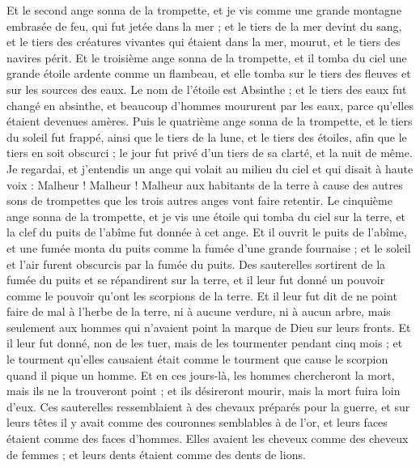 \begin{multicols}{2}
Et le second ange sonna de la trompette, et je vis comme une grande montagne embrasée de feu, qui fut jetée dans la mer ; et le tiers de la mer devint du sang,
et le tiers des créatures vivantes qui étaient dans la mer, mourut, et le tiers des navires périt.
Et le troisième ange sonna de la trompette, et il tomba du ciel une grande étoile ardente comme un flambeau, et elle tomba sur le tiers des fleuves et sur les sources des eaux.
Le nom de l'étoile est Absinthe ; et le tiers des eaux fut changé en absinthe, et beaucoup d'hommes moururent par les eaux, parce qu'elles étaient devenues amères.
Puis le quatrième ange sonna de la trompette, et le tiers du soleil fut frappé, ainsi que le tiers de la lune, et le tiers des étoiles, afin que le tiers en soit obscurci ; le jour fut privé d'un tiers de sa clarté, et la nuit de même.
Je regardai, et j'entendis un ange qui volait au milieu du ciel et qui disait à haute voix : Malheur ! Malheur ! Malheur aux habitants de la terre à cause des autres sons de trompettes que les trois autres anges vont faire retentir.
\VerseOne{}Le cinquième ange sonna de la trompette, et je vis une étoile qui tomba du ciel sur la terre, et la clef du puits de l'abîme fut donnée à cet ange.
Et il ouvrit le puits de l'abîme, et une fumée monta du puits comme la fumée d'une grande fournaise ; et le soleil et l'air furent obscurcis par la fumée du puits.
Des sauterelles sortirent de la fumée du puits et se répandirent sur la terre, et il leur fut donné un pouvoir comme le pouvoir qu'ont les scorpions de la terre.
Et il leur fut dit de ne point faire de mal à l'herbe de la terre, ni à aucune verdure, ni à aucun arbre, mais seulement aux hommes qui n'avaient point la marque de Dieu sur leurs fronts.
Et il leur fut donné, non de les tuer, mais de les tourmenter pendant cinq mois ; et le tourment qu'elles causaient était comme le tourment que cause le scorpion quand il pique un homme.
Et en ces jours-là, les hommes chercheront la mort, mais ils ne la trouveront point ; et ils désireront mourir, mais la mort fuira loin d'eux.
Ces sauterelles ressemblaient à des chevaux préparés pour la guerre, et sur leurs têtes il y avait comme des couronnes semblables à de l'or, et leurs faces étaient comme des faces d'hommes.
Elles avaient les cheveux comme des cheveux de femmes ; et leurs dents étaient comme des dents de lions.

\end{multicols}
